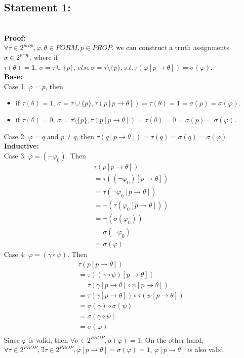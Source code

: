 \documentclass[12pt]{article}
\renewcommand{\phi}{\varphi}
\begin{document}
\subsection*{Statement 1:}\\
\textbf{Proof:} \\
$\forall \tau \in 2^{prop}, \phi, \theta \in {FORM}, p \in {PROP}$, we can construct a truth assignments $\sigma \in 2^{prop}$, where if $\tau(\theta) = 1, \, \sigma = \tau \cup \{p\} , \, else \, \sigma = \tau \setminus \{p\}, s.t. \, \tau(\phi[p \rightarrow \theta]) = \sigma(\phi)$. \\
\textbf{Base:} \\
Case 1: $\phi = p$, then 
\begin{itemize}
    \item if $\tau(\theta) = 1, \, \sigma = \tau \cup \{p\} , \tau(p[p \rightarrow \theta]) = \tau(\theta) = 1 = \sigma(p) = \sigma(\phi)$.
    \item if $\tau(\theta) = 0, \, \sigma = \tau \setminus \{p\} , \tau(p[p \rightarrow \theta]) = \tau(\theta) = 0 = \sigma(p) = \sigma(\phi)$.
\end{itemize}
Case 2: $\phi = q$ and $p \neq q$, then $\tau(q[p \rightarrow \theta]) = \tau(q) = \sigma(q) = \sigma(\phi)$.\\
\textbf{Inductive:} \\
Case 3: $\phi = (\neg \phi_{0})$. Then 
\begin{align*}
    &\tau(p[p \rightarrow \theta])  \\
    &= \tau((\neg \phi_{0})[p \rightarrow \theta])\\
    &= \tau(\neg \phi_{0}[p \rightarrow \theta]) \\
    &= \neg (\tau(\phi_{0}[p \rightarrow \theta]))\\
    &= \neg(\sigma(\phi_{0}))\\
    &= \sigma (\neg \phi_{0})\\
    &= \sigma (\phi)
\end{align*}
Case 4: $\phi = (\gamma \circ \psi)$. Then 
\begin{align*}
    &\tau(p[p \rightarrow \theta])  \\
    & = \tau((\gamma \circ \psi)[p \rightarrow \theta]) \\
    & = \tau(\gamma[p \rightarrow \theta] \circ \psi[p \rightarrow \theta])\\
    & = \tau(\gamma[p \rightarrow \theta]) \circ \tau(\psi[p \rightarrow \theta])\\
    & = \sigma(\gamma) \circ \sigma (\psi)\\
    & = \sigma(\gamma \circ \psi) \\
    & = \sigma(\phi) \\
\end{align*}
Since $\phi$ is valid, then $\forall \sigma \in 2 ^ {PROP}, \sigma(\phi) = 1$. On the other hand, $\forall \tau \in 2 ^ {PROP}, \exists \tau \in 2 ^ {PROP}, \phi[p \rightarrow \theta] = \sigma(\phi) = 1$,  $\phi[p \rightarrow \theta]$ is also valid.
\end{document}
